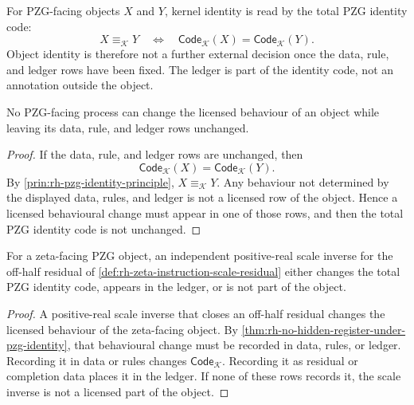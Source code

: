 \begin{principle}
\label{prin:rh-pzg-identity-principle}
For PZG-facing objects $X$ and $Y$, kernel identity is read by the total
PZG identity code:
$$
X\equiv_{\mathcal K}Y
\quad\Longleftrightarrow\quad
\mathsf{Code}_{\mathcal K}(X)=\mathsf{Code}_{\mathcal K}(Y).
$$
Object identity is therefore not a further external decision once the
data, rule, and ledger rows have been fixed.  The ledger is part of the
identity code, not an annotation outside the object.
\end{principle}

\begin{theorem}
\label{thm:rh-no-hidden-register-under-pzg-identity}
No PZG-facing process can change the licensed behaviour of an object
while leaving its data, rule, and ledger rows unchanged.
\end{theorem}

\begin{proof}
If the data, rule, and ledger rows are unchanged, then
$$
\mathsf{Code}_{\mathcal K}(X)
=
\mathsf{Code}_{\mathcal K}(Y).
$$
By \autoref{prin:rh-pzg-identity-principle}, $X\equiv_{\mathcal K}Y$.
Any behaviour not determined by the displayed data, rules, and ledger is
not a licensed row of the object.  Hence a licensed behavioural change
must appear in one of those rows, and then the total PZG identity code is
not unchanged.
\end{proof}

\begin{corollary}
\label{cor:rh-scale-inverse-changes-identity-or-ledger}
For a zeta-facing PZG object, an independent positive-real scale inverse
for the off-half residual of
\autoref{def:rh-zeta-instruction-scale-residual} either changes the total
PZG identity code, appears in the ledger, or is not part of the object.
\end{corollary}

\begin{proof}
A positive-real scale inverse that closes an off-half residual changes
the licensed behaviour of the zeta-facing object.  By
\autoref{thm:rh-no-hidden-register-under-pzg-identity}, that behavioural
change must be recorded in data, rules, or ledger.  Recording it in data
or rules changes $\mathsf{Code}_{\mathcal K}$.  Recording it as residual
or completion data places it in the ledger.  If none of these rows records
it, the scale inverse is not a licensed part of the object.
\end{proof}


